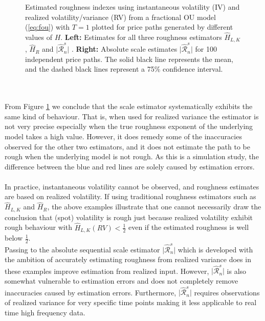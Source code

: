 \documentclass{article}
\begin{document}
\begin{figure}[htbp]
    \caption{Estimated roughness indexes using instantaneous volatility (IV) and realized volatility/variance (RV) from a fractional OU model (\ref{eq:fou}) with $T=1$ plotted for price paths generated by different values of $H$. \textbf{Left:} Estimates for all three roughness estimators $\widehat{H}_{L,K}$, $\widehat{H}_R$ and $\lvert \widehat{\mathscr{R}}_n^s\rvert$ . \textbf{Right:} Absolute scale estimates $\lvert \widehat{\mathscr{R}}_n^s\rvert$ for 100 independent price paths. The solid black line represents the mean, and the dashed black lines represent a 75\% confidence interval.}
    \label{fig:ex7singleincl_scale}
\end{figure}\\\\
From Figure \ref{fig:ex7singleincl_scale} we conclude that the scale estimator systematically exhibits the same kind of behaviour. That is, when used for realized variance the estimator is not very precise especially when the true roughness exponent of the underlying model takes a high value. However, it does remedy some of the inaccuracies observed for the other two estimators, and it does not estimate the path to be rough when the underlying model is not rough. As this is a simulation study, the difference between the blue and red lines are solely caused by estimation errors. \\\\
In practice, instantaneous volatility cannot be observed, and roughness estimates are based on realized volatility. If using traditional roughness estimators such as $\widehat{H}_{L,K}$ and $\widehat{H}_R$, the above examples illustrate that one cannot necessarily draw the conclusion that (spot) volatility is rough just because realized volatility exhibit rough behaviour with $\hat{H}_{L,K}(RV)<\frac{1}{2}$ even if the estimated roughness is well below $\frac{1}{2}$.\\
Passing to the absolute sequential scale estimator $\lvert \widehat{\mathscr{R}}_n^s\rvert$ which is developed with the ambition of accurately estimating roughness from realized variance does in these examples improve estimation from realized input. However, $\lvert \widehat{\mathscr{R}}_n^s\rvert$ is also somewhat vulnerable to estimation errors and does not completely remove inaccuracies caused by estimation errors. Furthermore, $\lvert \widehat{\mathscr{R}}_n^s\rvert$ requires observations of realized variance for very specific time points making it less applicable to real time high frequency data. 
\end{document}
